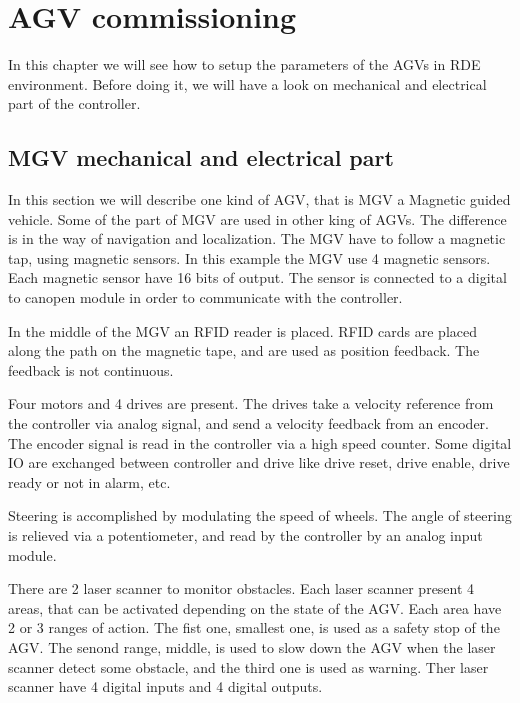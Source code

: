 

\chapter{AGV commissioning}
In this chapter we will see how to setup the parameters of the AGVs in RDE environment. Before doing it, we will have a look on mechanical and electrical part of the controller.

%
\section{MGV mechanical and electrical part}
In this section we will describe one kind of AGV, that is MGV a  Magnetic guided vehicle. Some of the part of MGV are used in other king of AGVs. The difference is in the way of navigation and localization. The MGV have to follow a magnetic tap, using magnetic sensors. In this example the MGV use 4 magnetic sensors. Each magnetic sensor have 16 bits of output. The sensor is connected to a digital to canopen module in order to communicate with the controller.

In the middle of the MGV an RFID reader is placed. RFID cards are placed along the path on the magnetic tape, and are used as position feedback. The feedback is not continuous. 

Four motors and 4 drives are present. The drives take a velocity reference from the controller via analog signal, and send a velocity feedback from an encoder. The encoder signal is read in the controller via a high speed counter. Some digital IO are exchanged between controller and drive like drive reset, drive enable, drive ready or not in alarm, etc.

Steering is accomplished by modulating the speed of wheels. The angle of steering is relieved via a potentiometer, and read by the controller by an analog input module.

There are 2 laser scanner to monitor obstacles. Each laser scanner present 4 areas, that can be activated depending on the state of the AGV. Each area have 2 or 3 ranges of action. The fist one, smallest one, is used as a safety stop of the AGV. The senond range, middle, is used to slow down the AGV when the laser scanner detect some obstacle, and the third one is used as warning. Ther laser scanner have 4 digital inputs and 4 digital outputs.

